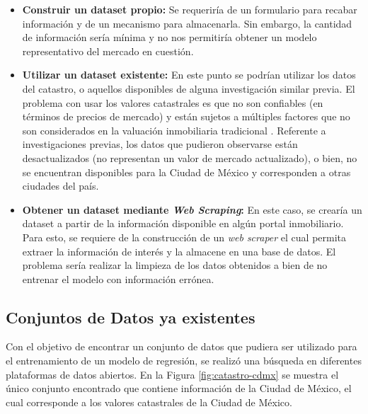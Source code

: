 \begin{itemize}
  \item \textbf{Construir un \gls{dataset} propio:} Se requeriría de un formulario
  para recabar información y de un mecanismo para almacenarla. Sin embargo,
  la cantidad de información sería mínima y no nos permitiría obtener un modelo
  representativo del mercado en cuestión.
  \item \textbf{Utilizar un \gls{dataset} existente:} En este punto se podrían
  utilizar los datos del catastro, o aquellos disponibles de alguna investigación
  similar previa. El problema con usar los valores catastrales es que no son
  confiables (en términos de precios de mercado) y están sujetos a múltiples
  factores que no son considerados en la valuación inmobiliaria tradicional \cite{eguino2020catastro}.
  Referente a investigaciones previas, los datos que pudieron observarse están
  desactualizados (no representan un valor de mercado actualizado), o bien, no
  se encuentran disponibles para la Ciudad de México y corresponden a otras
  ciudades del país.
  \item \textbf{Obtener un \gls{dataset} mediante \textit{Web Scraping}:} En este
  caso, se crearía un \gls{dataset} a partir de la información disponible en
  algún portal inmobiliario. Para esto, se requiere de la construcción de un
  \textit{web scraper} el cual permita extraer la información de interés y la
  almacene en una base de datos. El problema sería realizar la limpieza de los
  datos obtenidos a bien de no entrenar el modelo con información errónea.
\end{itemize}

\subsection{Conjuntos de Datos ya existentes}

Con el objetivo de encontrar un conjunto de datos que pudiera ser utilizado
para el entrenamiento de un modelo de regresión, se realizó una búsqueda en
diferentes plataformas de datos abiertos. En la Figura \ref{fig:catastro-cdmx}
se muestra el único conjunto encontrado que contiene información de la Ciudad
de México, el cual corresponde a los valores catastrales de la Ciudad de México.

